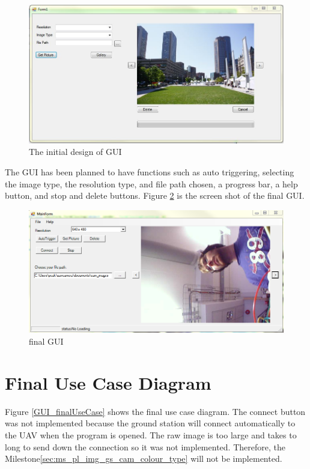 \begin{figure}[H]
\begin{center}
\includegraphics[width=1.0\textwidth]{figures/initialGUI.png} 
\end{center}
\caption{The initial design of GUI\label{ini_GUI}}
\end{figure}
The GUI has been planned to have functions such as auto triggering, selecting the image type, the resolution type, and file path chosen, a progress bar, a help button, and stop and delete buttons. Figure \ref{finalGUI} is the screen shot of the final GUI.

\begin{figure}[H]
\begin{center}
\includegraphics[width=1.0\textwidth]{figures/finalGUI.png} 
\end{center}
\caption{final GUI\label{finalGUI}}
\end{figure}

\section{Final Use Case Diagram}
Figure \ref{GUI_finalUseCase} shows the final use case diagram.
The connect button was not implemented because the ground station will connect automatically to the UAV when the program is opened.
The raw image is too large and takes to long to send down the connection so it was not implemented.
Therefore, the Milestone\ref{sec:ms_pl_img_gs_cam_colour_type} will not be implemented.


